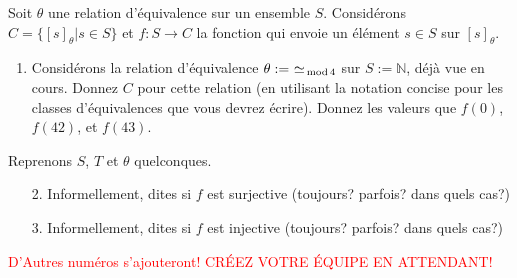 \documentclass[11pt]{article}
\newcommand{\rouge}[1]{\textcolor{red}{#1}}
\newcounter{exercice}\newcommand{\exercice}{ \bigskip \addtocounter{exercice}{1}\noindent \textbf{Exercice \theexercice}\\}
\renewcommand{\mod}{\textrm{\,mod\,}}
\begin{document}
\exercice
Soit $\theta$ une relation d'équivalence sur un ensemble $S$. Considérons $C = \{[s]_{\theta} | s\in S\}$ et $f: S\to C$ la fonction qui envoie un élément $s \in S$ sur $[s]_{\theta}$. 
\begin{enumerate}%
\item Considérons la relation d'équivalence $\theta:=~\simeq_{\mod 4}$ sur $S:=\mathbb{N}$, déjà vue en cours. Donnez $C$ pour cette relation (en utilisant la notation concise pour les classes d'équivalences que vous devrez écrire). Donnez les valeurs que $f(0)$, $f(42)$, et $f(43)$.
\end{enumerate}
Reprenons $S$, $T$ et $\theta$  quelconques.
\begin{enumerate}
\item [2.]
Informellement, dites si $f$ est surjective (toujours? parfois? dans quels cas?)
\item[3.]
Informellement, dites si  $f$ est injective  (toujours? parfois? dans quels cas?)
\end{enumerate}
\vfill
\rouge{D'Autres numéros s'ajouteront! CRÉEZ VOTRE ÉQUIPE EN ATTENDANT!}
\vfill\vfill\vfill\vfill\vfill\vfill\vfill
\end{document}
